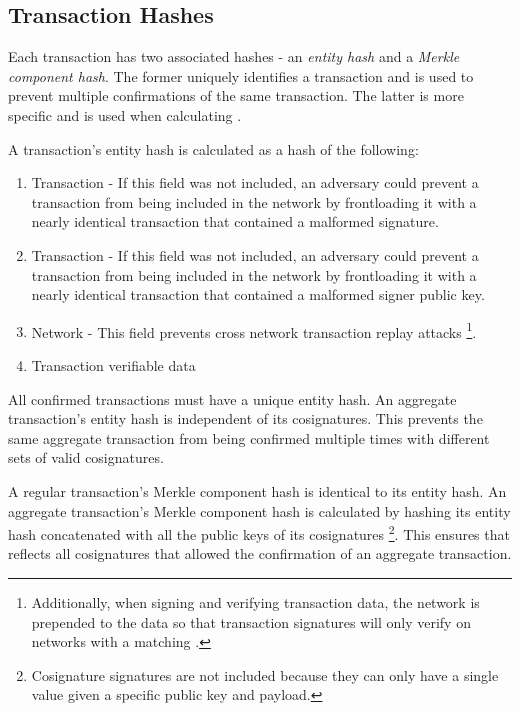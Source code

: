 \subsection{Transaction Hashes}

Each transaction has two associated hashes - an \emph{entity hash} and a \emph{Merkle component hash}.
The former uniquely identifies a transaction and is used to prevent multiple confirmations of the same transaction.
The latter is more specific and is used when calculating  .

A transaction's entity hash is calculated as a hash of the following:
\begin{enumerate}
	\item{Transaction  -
		If this field was not included, an adversary could prevent a transaction from being included in the network
		by frontloading it with a nearly identical transaction that contained a malformed signature.
	}
	\item{Transaction  -
		If this field was not included, an adversary could prevent a transaction from being included in the network
		by frontloading it with a nearly identical transaction that contained a malformed signer public key.
	}
	\item{Network  -
		This field prevents cross network transaction replay attacks
		\footnote{
			Additionally, when signing and verifying transaction data, the network  is prepended to the data
			so that transaction signatures will only verify on networks with a matching .
		}.
	}
	\item{Transaction verifiable data}
\end{enumerate}

All confirmed transactions must have a unique entity hash.
An aggregate transaction's entity hash is independent of its cosignatures.
This prevents the same aggregate transaction from being confirmed multiple times with different sets of valid cosignatures.

A regular transaction's Merkle component hash is identical to its entity hash.
An aggregate transaction's Merkle component hash is calculated by hashing its entity hash concatenated with all the public keys of its cosignatures
\footnote{Cosignature signatures are not included because they can only have a single value given a specific public key and payload.}.
This ensures that  reflects all cosignatures that allowed the confirmation of an aggregate transaction.
